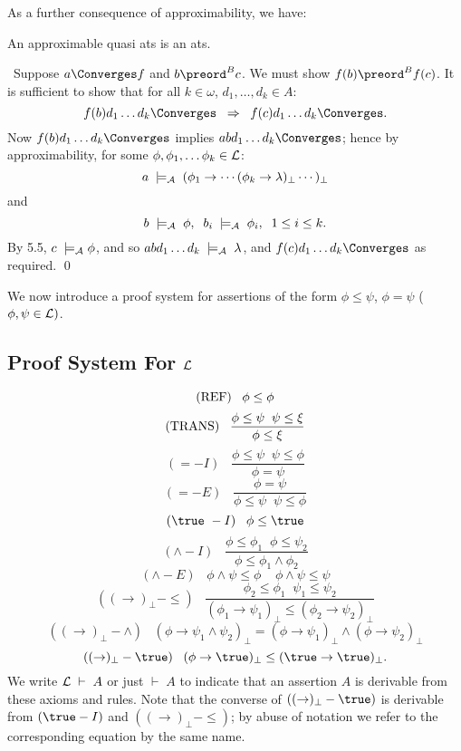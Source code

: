 As a further consequence of approximability, we have:
\begin{proposition}
An approximable quasi ats is an ats.
\end{proposition}

\proof\ Suppose $a \Converges f$ and $b \preord^{B} c$. We must show $f(b) \preord^{B} f(c)$. It is sufficient to show that for all $k \in \omega$, $d_{1}, \ldots , d_{k} \in A$:
\[ f(b) d_{1} \ldots d_{k} \Converges \;\; \Rightarrow \;\; f(c) d_{1} \ldots d_{k} \Converges . \]
Now $f(b) d_{1} \ldots d_{k} \Converges$ implies $a b d_{1} \ldots d_{k} \Converges$; hence by approximability, for some $\phi, \phi_{1}, \ldots \phi_{k} \in {\cal L}$:
\[ a \; \models_{\cal A} \; (\phi_{1} \rightarrow \cdots ( \phi_{k} \rightarrow \lambda )_{\bot} \cdots )_{\bot} \]
and
\[ b \; \models_{\cal A} \; \phi , \;\;  b_{i} \; \models_{\cal A} \; \phi_{i} , \;\; 1 \leq i \leq k . \]
By 5.5, $c \; \models_{\cal A} \phi$, and so $a b d_{1} \ldots d_{k} \; \models_{\cal A} \; \lambda$, and $f(c) d_{1} \ldots d_{k} \Converges$ as required. \qed

We now introduce a proof system for assertions of the form $\phi \leq \psi$, $\phi = \psi$ ($\phi , \psi \in {\cal L})$.
\subsection*{Proof System For $\cal L$}
\[ ({\rm REF}) \;\;\; \phi \leq \phi \]
\[ ({\rm TRANS}) \;\;\; \frac{\phi \leq \psi \;\; \psi \leq \xi}{\phi \leq \xi} \]
\[ (=-I) \;\;\; \frac{\phi \leq \psi \;\; \psi \leq \phi}{\phi = \psi} \]
\[ (=-E) \;\;\; \frac{\phi = \psi}{\phi \leq \psi \;\; \psi \leq \phi} \]
\[(\true\ -I) \;\;\; \phi \leq \true \]
\[ (\wedge -I) \;\;\; \frac{\phi \leq \phi_{1} \;\; \phi \leq \psi_{2}}{\phi \leq \phi_{1} \wedge \phi_{2}} \]
\[ (\wedge -E) \;\;\; \phi \wedge \psi \leq \phi \;\;\;\; \phi \wedge \psi \leq \psi \]
\[ ((\rightarrow )_{\bot}-\leq ) \;\;\; \frac{\phi_{2} \leq \phi_{1} \;\; \psi_{1} \leq \psi_{2}}{(\phi_{1} \rightarrow \psi_{1})_{\bot} \leq (\phi_{2} \rightarrow \psi_{2})_{\bot}} \]
\[ ((\rightarrow )_{\bot}-\wedge ) \;\;\; (\phi \rightarrow \psi_{1} \wedge \psi_{2} )_{\bot} = (\phi \rightarrow \psi_{1})_{\bot} \wedge (\phi \rightarrow \psi_{2})_{\bot} \]
\[ ((\rightarrow )_{\bot}-\true ) \;\;\; (\phi \rightarrow \true )_{\bot} \leq (\true \rightarrow \true )_{\bot} . \]
We write ${\cal L} \; \vdash \; A$ or just $\vdash \; A$ to indicate that an assertion $A$ is derivable from these axioms and rules.
Note that the converse of $((\rightarrow )_{\bot}-\true )$ is derivable from 
$(\true -I)$ and $((\rightarrow )_{\bot}-\leq )$; 
by abuse of notation we refer to the corresponding equation by the same name.

